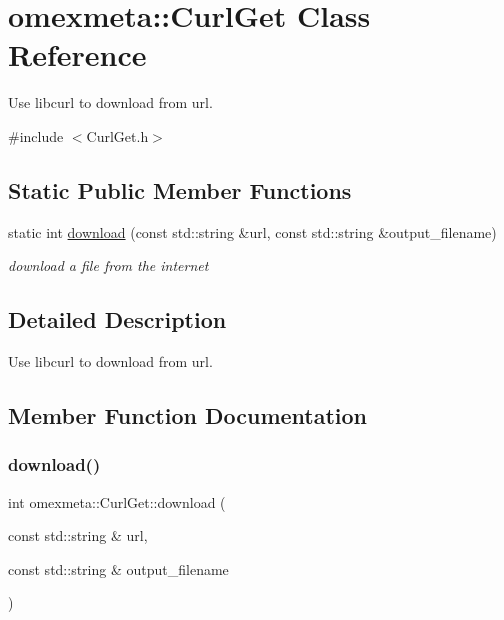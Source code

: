 \hypertarget{classomexmeta_1_1CurlGet}{}\section{omexmeta\+:\+:Curl\+Get Class Reference}
\label{classomexmeta_1_1CurlGet}


Use libcurl to download from url.  




{\ttfamily \#include $<$Curl\+Get.\+h$>$}

\subsection*{Static Public Member Functions}
\begin{DoxyCompactItemize}
\item 
static int \hyperlink{classomexmeta_1_1CurlGet_a52eaa2b1179cf49ec298022011b2477c}{download} (const std\+::string \&url, const std\+::string \&output\+\_\+filename)
\begin{DoxyCompactList}\small\item\em download a file from the internet \end{DoxyCompactList}\end{DoxyCompactItemize}


\subsection{Detailed Description}
Use libcurl to download from url. 

\subsection{Member Function Documentation}
\mbox{\label{classomexmeta_1_1CurlGet_a52eaa2b1179cf49ec298022011b2477c}} 
\subsubsection{\texorpdfstring{download()}{download()}}
{\footnotesize\ttfamily int omexmeta\+::\+Curl\+Get\+::download (\begin{DoxyParamCaption}\item[{const std\+::string \&}]{url,  }\item[{const std\+::string \&}]{output\+\_\+filename }\end{DoxyParamCaption})\hspace{0.3cm}{\ttfamily [static]}}



